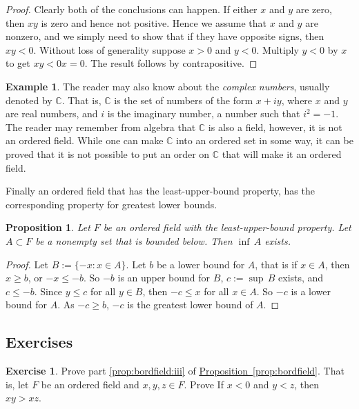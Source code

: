 \documentclass[12pt]{book}
\newcommand{\C}{{\mathbb{C}}}
\newcommand{\myindex}[1]{#1\index{#1}}
\theoremstyle{plain}
\newtheorem{prop}[thm]{Proposition}
\theoremstyle{remark}
\theoremstyle{definition}
\theoremstyle{exercise}
\newtheorem{exercise}{Exercise}[section]
\theoremstyle{example}
\newtheorem{example}[thm]{Example}
\newcommand{\propref}[1]{\hyperref[#1]{Proposition~\ref*{#1}}}
\begin{document}
\begin{proof}
Clearly both of the conclusions can happen.  If either
$x$ and $y$ are zero, then $xy$ is zero and hence not positive.
Hence we assume that $x$ and $y$ are nonzero,
and we simply need to show that if they have opposite signs, then
$xy < 0$.
Without loss of
generality suppose $x > 0$ and $y < 0$.  Multiply $y < 0$ by $x$ to get
$xy < 0x = 0$.  The result follows by contrapositive.
\end{proof}

\begin{example}
The reader may also know about the \emph{\myindex{complex numbers}},
usually denoted by
$\C$.  That is, $\C$ is the set of numbers of
the form $x + iy$, where $x$ and $y$ are real numbers, and $i$ is the
imaginary number, a number such that $i^2 = -1$.  The reader may
remember from algebra that $\C$ is also a field, however, it is not an
ordered field.  While one can make $\C$ into an ordered set in some way,
it can be proved that it is not possible to put an
order on $\C$ that will make it an ordered field.
\end{example}

Finally an ordered field that has the least-upper-bound property, has the
corresponding property for greatest lower bounds.

\begin{prop}
Let $F$ be an ordered field with the least-upper-bound property.
Let $A \subset F$ be a nonempty set that is bounded below.
Then $\inf\, A$ exists.
\end{prop}

\begin{proof}
Let $B := \{ -x : x \in A \}$. Let $b$ be a lower bound for $A$,
that is if $x \in A$, then $x \geq b$, or $-x \leq -b$.  So $-b$
is an upper bound for $B$, $c:=\sup\, B$ exists, and $c \leq -b$.
Since $y \leq c$
for all $y \in B$, then $-c \leq x$ for all $x \in A$.
So
$-c$ is a lower bound for $A$.  As $-c \geq b$,
$-c$ is the greatest lower bound of $A$.
\end{proof}

\subsection{Exercises}

\begin{exercise}
Prove part \ref{prop:bordfield:iii} of \propref{prop:bordfield}.
That is, let $F$ be an ordered field and $x,y,z \in F$.  Prove
If $x < 0$ and $y < z$, then $xy > xz$.
\end{exercise}
\end{document}
